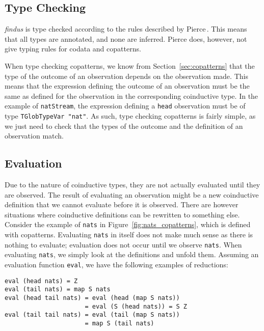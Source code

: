 \subsection{Type Checking}
\textit{findus} is type checked according to the rules described by Pierce\,\cite{Pierce:2002:TPL:509043}. This means that all types are annotated, and none are inferred. Pierce does, however, not give typing rules for codata and copatterns. 

When type checking copatterns, we know from Section~\ref{sec:copatterns} that the type of the outcome of an observation depends on the observation made. This means that the expression defining the outcome of an observation must be the same as defined for the observation in the corresponding coinductive type. In the example of \texttt{natStream}, the expression defining a \texttt{head} observation must be of type \texttt{TGlobTypeVar "nat"}. As such, type checking copatterns is fairly simple, as we just need to check that the types of the outcome and the definition of an observation match.

\subsection{Evaluation}
Due to the nature of coinductive types, they are not actually evaluated until they are observed. The result of evaluating an observation might be a new coinductive definition that we cannot evaluate before it is observed. There are however situations where coinductive definitions can be rewritten to something else. Consider the example of \texttt{nats} in Figure~\ref{fig:nats_copatterns}, which is defined with copatterns. Evaluating \texttt{nats} in itself does not make much sense as there is nothing to evaluate; evaluation does not occur until we observe \texttt{nats}. When evaluating \texttt{nats}, we simply look at the definitions and unfold them. Assuming an evaluation function \texttt{eval}, we have the following examples of reductions:

\begin{Verbatim}[commandchars=\\\{\},codes={\catcode`$=3\catcode`_=8}]
eval (head nats) = Z
eval (tail nats) = map S nats
eval (head tail nats) = eval (head (map S nats)) 
                      = eval (S (head nats)) = S Z
eval (tail tail nats) = eval (tail (map S nats)) 
                      = map S (tail nats)
\end{Verbatim}

